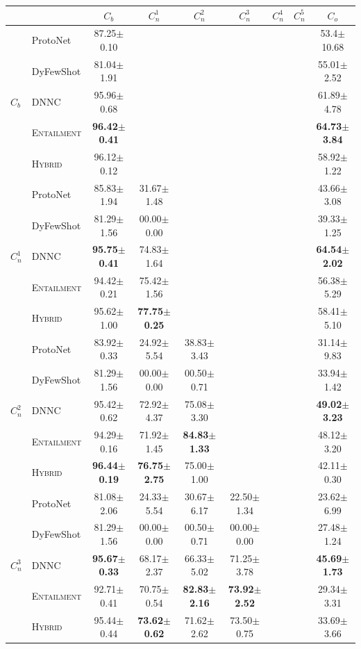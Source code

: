 \documentclass[11pt]{article}
\newcommand{\modelname}{\textsc{Entailment}}
\newcommand{\hybrid}{\textsc{Hybrid}}
\begin{document}
\begin{table}[t]
\setlength{\tabcolsep}{4.5pt}
\small
  \centering
  \begin{tabular}{ll|c|c|c|c|c|c|c}
 & & $C_b$ & $C_n^1$ & $C_n^2$ & $C_n^3$ & $C_n^4$ & $C_n^5$ & $C_o$\\\hline\hline 
\multirow{5}{*}{$C_b$} & ProtoNet & 87.25$\pm$0.10 & & & & & &53.4$\pm$10.68\\
 & DyFewShot & 81.04$\pm$1.91  & & & & & & 55.01$\pm$2.52 \\
  &  DNNC & 95.96$\pm$0.68& & & & & & 61.89$\pm$4.78 \\
    &  \modelname & \textbf{96.42$\pm$0.41} & & & & & & \textbf{64.73$\pm$3.84}\\
  &  \hybrid &96.12$\pm$0.12 & & & & & &58.92$\pm$1.22 \\\hline
  
 \multirow{5}{*}{$C_n^1$} & ProtoNet & 85.83$\pm$1.94 &31.67$\pm$1.48 & & & & & 43.66$\pm$3.08\\
    & DyFewShot & 81.29$\pm$1.56  &  00.00$\pm$0.00 & & & & & 39.33$\pm$1.25 \\
  &  DNNC & \textbf{95.75$\pm$0.41}& 74.83$\pm$1.64& & & & &\textbf{64.54$\pm$2.02}\\
   &  \modelname & 94.42$\pm$0.21 &75.42$\pm$1.56 & & & & & 56.38$\pm$5.29\\
  &  \hybrid & 95.62$\pm$1.00& \textbf{77.75$\pm$0.25}& & & & & 58.41$\pm$5.10\\\hline
  
 \multirow{5}{*}{$C_n^2$} & ProtoNet & 83.92$\pm$0.33 &24.92$\pm$5.54 &38.83$\pm$3.43 & & & & 31.14$\pm$9.83\\
   & DyFewShot & 81.29$\pm$1.56 & 00.00$\pm$0.00 & 00.50$\pm$0.71 & & & & 33.94$\pm$1.42 \\
 &  DNNC  &95.42$\pm$0.62 &72.92$\pm$4.37 & 75.08$\pm$3.30& & & & \textbf{49.02$\pm$3.23}\\
    &  \modelname & 94.29$\pm$0.16 &71.92$\pm$1.45 &\textbf{84.83$\pm$1.33} & & & & 48.12$\pm$3.20\\
  &  \hybrid &\textbf{96.44$\pm$0.19} &\textbf{76.75$\pm$2.75}& 75.00$\pm$1.00& & & & 42.11$\pm$0.30\\\hline
  
 \multirow{5}{*}{$C_n^3$} & ProtoNet & 81.08$\pm$2.06 &24.33$\pm$5.54 &30.67$\pm$6.17 &22.50$\pm$1.34 & & & 23.62$\pm$6.99\\
   & DyFewShot & 81.29$\pm$1.56 & 00.00$\pm$0.00 & 00.50$\pm$0.71 & 00.00$\pm$0.00 & &  &27.48$\pm$1.24 \\
     &  DNNC &\textbf{95.67$\pm$0.33} & 68.17$\pm$2.37&66.33$\pm$5.02 &71.25$\pm$3.78 & & & \textbf{45.69$\pm$1.73} \\
 & \modelname & 92.71$\pm$0.41& 70.75$\pm$0.54&\textbf{82.83$\pm$2.16} &\textbf{73.92$\pm$2.52} & & &  29.34$\pm$3.31\\
  &  \hybrid & 95.44$\pm$0.44& \textbf{73.62$\pm$0.62}&71.62$\pm$2.62 &73.50$\pm$0.75 & & & 33.69$\pm$3.66 \\\hline
  

\end{tabular}
\end{table}
\end{document}
